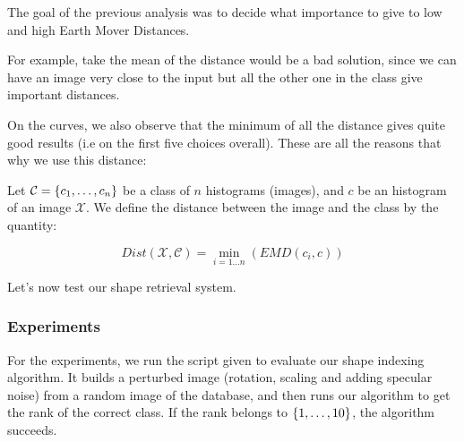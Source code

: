 The goal of the previous analysis was to decide what importance to give to low and high Earth Mover Distances.

For example, take the mean of the distance would be a bad solution, since we can have an image very close to the input but all the other one in the class give important distances.

On the curves, we also observe that the minimum of all the distance gives quite good results (i.e on the first five choices overall). These are all the reasons that why we use this distance:

\begin{definition}
	Let $\mathcal{C} = \left\{ c_1,\dots,c_n \right\}$ be a class of $n$ histograms (images), and $c$ be an histogram of an image $\mathcal{X}$. We define the distance between the image and the class by the quantity:

\[
	Dist(\mathcal{X},\mathcal{C}) = \underset{i = 1 \dots n}{\operatorname{min}} \left( EMD(c_i,c) \right)
\]

\end{definition}

Let's now test our shape retrieval system.

\subsubsection{Experiments}

For the experiments, we run the script given to evaluate our shape indexing algorithm. It builds a perturbed image (rotation, scaling and adding specular noise) from a random image of the database, and then runs our algorithm to get the rank of the correct class. If the rank belongs to $\left\{ 1,\dots,10 \right\}$, the algorithm succeeds.


